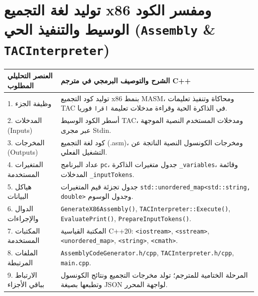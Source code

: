 \documentclass[11pt,a4paper,oneside]{report}
\begin{document}
\section{توليد لغة التجميع x86 ومفسر الكود الوسيط والتنفيذ الحي (\texttt{Assembly} \& \texttt{TACInterpreter})}
\begin{longtable}{|p{4.2cm}|p{12.2cm}|}
\hline
\rowcolor{NavyBlue}\color{white}\textbf{\arabicfont العنصر التحليلي المطلوب} & \rowcolor{NavyBlue}\color{white}\textbf{\arabicfont الشرح والتوصيف البرمجي في مترجم C++} \\
\hline
\endhead
1. وظيفة الجزء & توليد كود التجميع x86 بنمط MASM، ومحاكاة وتنفيذ تعليمات TAC في الذاكرة الحية وقراءة مدخلات تعليمة \texttt{اقرا} فوريا. \\
\hline
2. المدخلات (Inputs) & أسطر الكود الوسيط TAC، ومدخلات المستخدم النصية الموجهة عبر مجرى Stdin. \\
\hline
3. المخرجات (Outputs) & كود لغة التجميع (.asm)، ومخرجات الكونسول النصية الناتجة عن التشغيل الفعلي. \\
\hline
4. المتغيرات المستخدمة & عداد البرنامج \texttt{pc}، جدول متغيرات الذاكرة \texttt{\_variables}، وقائمة المدخلات \texttt{\_inputTokens}. \\
\hline
5. هياكل البيانات & جدول تجزئة قيم المتغيرات \texttt{std::unordered\_map<std::string, double>} وجدول الوسوم. \\
\hline
6. الدوال والإجراءات & \texttt{GenerateX86Assembly()}, \texttt{TACInterpreter::Execute()}, \texttt{EvaluatePrint()}, \texttt{PrepareInputTokens()}. \\
\hline
7. المكتبات المستخدمة & المكتبة القياسية C++20: \texttt{<iostream>}, \texttt{<sstream>}, \texttt{<unordered\_map>}, \texttt{<string>}, \texttt{<cmath>}. \\
\hline
8. الملفات المرتبطة & \texttt{AssemblyCodeGenerator.h/cpp}, \texttt{TACInterpreter.h/cpp}, \texttt{main.cpp}. \\
\hline
9. الارتباط بباقي الأجزاء & المرحلة الختامية للمترجم؛ تولد مخرجات التجميع ونتائج الكونسول وتطبعها بصيغة JSON لواجهة المحرر. \\
\hline
\end{longtable}
\end{document}
